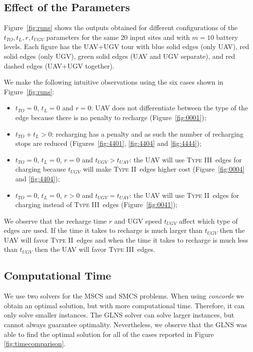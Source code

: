 \documentclass[letterpaper,10pt,conference]{ieeeconf}
\newcommand{\typetwo}{\textsc{Type II\ }}
\newcommand{\typethree}{\textsc{Type III\ }}
\begin{document}
\subsection{Effect of the Parameters} 

Figure~\ref{fig:runs} shows the outputs obtained for different configurations of the $t_{TO}, t_{L}, r, t_{UGV}$ parameters for the same 20 input sites and with $m=10$ battery levels. Each figure has the UAV+UGV tour with blue solid edges (only UAV), red solid edges (only UGV), green solid edges (UAV and UGV separate), and red dashed edges (UAV+UGV together). 

We make the following intuitive observations using the six cases shown in Figure~\ref{fig:runs}:
\begin{itemize}
\item $t_{TO} = 0$, $t_{L} = 0$ and $r = 0$: UAV does not differentiate between the type of the edge because there is no penalty to recharge (Figure~\ref{fig:0001});
\item $t_{TO} + t_{L} > 0$: recharging has a penalty and as such the number of recharging stops are reduced (Figures~\ref{fig:4401}, \ref{fig:4404} and \ref{fig:4444});
\item $t_{TO} = 0$, $t_{L} = 0$, $r = 0$ and $t_{UGV} > t_{UAV}$: the UAV will use \typethree edges for charging because $t_{UGV}$ will make \typetwo edges higher cost (Figure~\ref{fig:0004} and \ref{fig:4404});
\item $t_{TO} = 0$, $t_{L} = 0$, $r > 0$ and $t_{UGV} = t_{UAV}$: the UAV will use \typetwo edges for charging instead of \typethree edges (Figure~\ref{fig:0041});
\end{itemize}

We observe that %
the recharge time $r$ and UGV speed $t_{UGV}$ affect which type of edges are used. If the time it takes to recharge is much larger than $t_{UGV}$ then the UAV will favor  \typetwo edges and when the time it takes to recharge is much less than $t_{UGV}$ then the UAV will favor \typethree edges.%

\subsection{Computational Time}
We use two solvers for the MSCS and SMCS problems. When using \emph{concorde} we obtain an optimal solution, but with more computational time. Therefore, it can only solve smaller instances. The GLNS solver can solve larger instances, but cannot always guarantee optimality. Nevertheless, we observe that the GLNS was able to find the optimal solution for all of the cases reported in Figure \ref{fig:timecomparison}.
\end{document}
